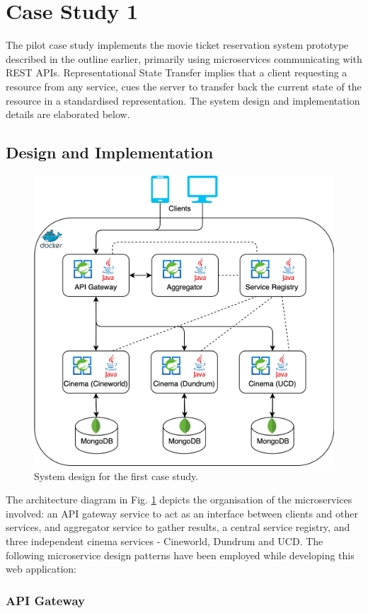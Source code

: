 \section{Case Study 1}

The pilot case study implements the movie ticket reservation system prototype described in the outline earlier, primarily using microservices communicating with REST APIs. Representational State Transfer implies that a client requesting a resource from any service, cues the server to transfer back the current state of the resource in a standardised representation. The system design and implementation details are elaborated below.

\subsection{Design and Implementation}

\begin{figure}[H]
	\centering
	\includegraphics[width=0.6\linewidth]{./assets/diagrams/cs01-arch.png}
	\caption{System design for the first case study.}
	\label{fig:cs01-arch}
\end{figure}

The architecture diagram in Fig. \ref{fig:cs01-arch} depicts the organisation of the microservices involved: an API gateway service to act as an interface between clients and other services, and aggregator service to gather results, a central service registry, and three independent cinema services - Cineworld, Dundrum and UCD. The following microservice design patterns have been employed while developing this web application:

\subsubsection{API Gateway}

